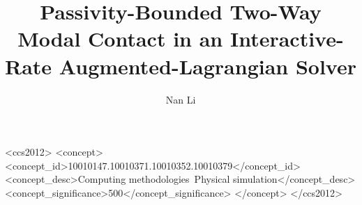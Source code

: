 \documentclass[sigconf,screen,review,anonymous]{acmart}
\title{Passivity-Bounded Two-Way Modal Contact in an Interactive-Rate
       Augmented-Lagrangian Solver}
\author{Nan Li}
\affiliation{%
  \institution{University of Southern California}
  \city{Los Angeles}\state{CA}\country{USA}}
\begin{document}


\begin{CCSXML}
<ccs2012>
<concept>
<concept_id>10010147.10010371.10010352.10010379</concept_id>
<concept_desc>Computing methodologies~Physical simulation</concept_desc>
<concept_significance>500</concept_significance>
</concept>
</ccs2012>
\end{CCSXML}



\maketitle









\end{document}
